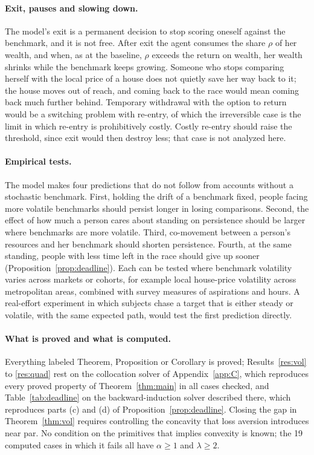 \documentclass[12pt]{article}
\theoremstyle{definition}
\theoremstyle{remark}
\theoremstyle{plain}
\theoremstyle{definition}
\begin{document}
\paragraph{Exit, pauses and slowing down.} The model's exit is a permanent decision to stop scoring oneself against the benchmark, and it is not free. After exit the agent consumes the share $\rho$ of her wealth, and when, as at the baseline, $\rho$ exceeds the return on wealth, her wealth shrinks while the benchmark keeps growing. Someone who stops comparing herself with the local price of a house does not quietly save her way back to it; the house moves out of reach, and coming back to the race would mean coming back much further behind. Temporary withdrawal with the option to return would be a switching problem with re-entry, of which the irreversible case is the limit in which re-entry is prohibitively costly. Costly re-entry should raise the threshold, since exit would then destroy less; that case is not analyzed here.

\paragraph{Empirical tests.} The model makes four predictions that do not follow from accounts without a stochastic benchmark. First, holding the drift of a benchmark fixed, people facing more volatile benchmarks should persist longer in losing comparisons. Second, the effect of how much a person cares about standing on persistence should be larger where benchmarks are more volatile. Third, co-movement between a person's resources and her benchmark should shorten persistence. Fourth, at the same standing, people with less time left in the race should give up sooner (Proposition~\ref{prop:deadline}). Each can be tested where benchmark volatility varies across markets or cohorts, for example local house-price volatility across metropolitan areas, combined with survey measures of aspirations and hours. A real-effort experiment in which subjects chase a target that is either steady or volatile, with the same expected path, would test the first prediction directly.

\paragraph{What is proved and what is computed.} Everything labeled Theorem, Proposition or Corollary is proved; Results~\ref{res:vol} to \ref{res:quad} rest on the collocation solver of Appendix~\ref{app:C}, which reproduces every proved property of Theorem~\ref{thm:main} in all cases checked, and Table~\ref{tab:deadline} on the backward-induction solver described there, which reproduces parts (c) and (d) of Proposition~\ref{prop:deadline}. Closing the gap in Theorem~\ref{thm:vol} requires controlling the concavity that loss aversion introduces near par. No condition on the primitives that implies convexity is known; the 19 computed cases in which it fails all have $\alpha\ge1$ and $\lambda\ge2$.
\end{document}
